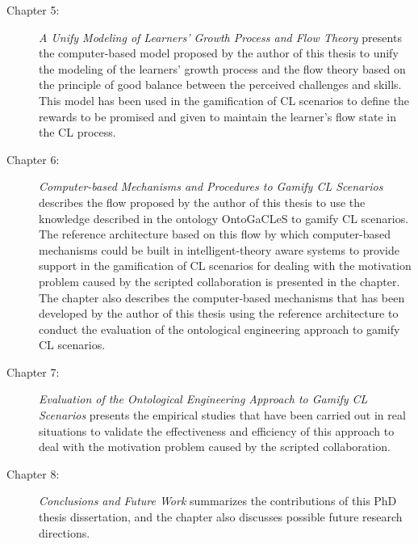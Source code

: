 \begin{description}
\item[Chapter 5:]
\emph{A Unify Modeling of Learners' Growth Process and Flow Theory} presents the computer-based model proposed by the author of this thesis to unify the modeling of the learners' growth process and the flow theory based on the principle of good balance between the perceived challenges and skills. This model has been used in the gamification of CL scenarios to define the rewards to be promised and given to maintain the learner's flow state in the CL process.

\item[Chapter 6:]
\emph{Computer-based Mechanisms and Procedures to Gamify CL Scenarios} describes the flow proposed by the author of this thesis to use the knowledge described in the ontology OntoGaCLeS to gamify CL scenarios. The reference architecture based on this flow by which computer-based mechanisms could be built in intelligent-theory aware systems to provide support in the gamification of CL scenarios for dealing with the motivation problem caused by the scripted collaboration is presented in the chapter. The chapter also describes the computer-based mechanisms that has been developed by the author of this thesis using the reference architecture to conduct the evaluation of the ontological engineering approach to gamify CL scenarios.

\item[Chapter 7:]
\emph{Evaluation of the Ontological Engineering Approach to Gamify CL Scenarios} presents the empirical studies that have been carried out in real situations to validate the effectiveness and efficiency of this approach to deal with the motivation problem caused by the scripted collaboration.

\item[Chapter 8:]
\emph{Conclusions and Future Work} summarizes the contributions of this PhD thesis dissertation, and the chapter also discusses possible future research directions.

\end{description}




